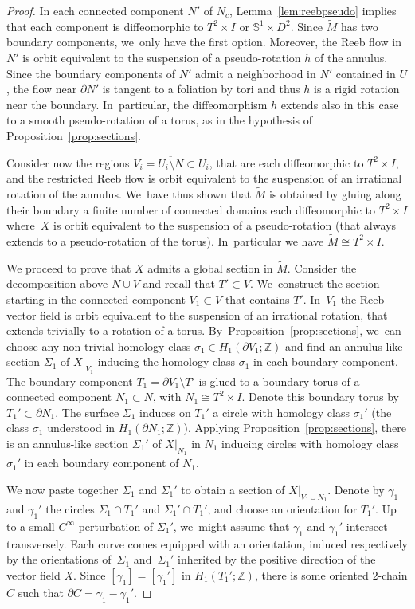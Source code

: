 \documentclass[11pt]{article}
\theoremstyle{definition}
\begin{document}
\begin{proof}
In each connected component $N'$ of $N_c$, Lemma~\ref{lem:reebpseudo} implies that each component is diffeomorphic to $T^2\times I$ or $\mathbb{S}^1\times D^2$. Since $\widetilde M$ has two boundary components, we~only have the first option. Moreover, the Reeb flow in $N'$ is orbit equivalent to the suspension of a pseudo-rotation $h$ of the annulus. Since the boundary components of $N'$ admit a neighborhood in $N'$ contained in $U$, the flow near $\partial N'$ is tangent to a foliation by tori and thus $h$ is a rigid rotation near the boundary. In~particular, the diffeomorphism $h$ extends also in this case to a smooth pseudo-rotation of a torus, as in the hypothesis of Proposition~\ref{prop:sections}.

Consider now the regions $V_i=\overline{U_i\setminus N}\subset U_i$, that are each diffeomorphic to $T^2\times I$, and the restricted Reeb flow is orbit equivalent to the suspension of an irrational rotation of the annulus. We~have thus shown that $\widetilde{M}$ is obtained by gluing along their boundary a finite number of connected domains each diffeomorphic to $T^2\times I$ where~$X$ is orbit equivalent to the suspension of a pseudo-rotation (that always extends to a pseudo-rotation of the torus). In~particular we have $\widetilde{M}\cong T^2\times I$.

{We proceed to prove that $X$ admits a global section in $\widetilde M$.} Consider the decomposition above $N\cup V$ and recall that $T'\subset V$. We~construct the section starting in the connected component $V_1\subset V$ that contains $T'$. In~$V_1$ the Reeb vector field is orbit equivalent to the suspension of an irrational rotation, that extends trivially to a rotation of a torus. By~Proposition~\ref{prop:sections}, we~can choose any non-trivial homology class $\sigma_1 \in H_1(\partial V_1; \mathbb{Z})$ and find an annulus-like section $\Sigma_1$ of $X|_{V_1}$ inducing the homology class $\sigma_1$ in each boundary component. The boundary component $T_1=\partial V_1\setminus T'$ is glued to a boundary torus of a connected component $N_1\subset N$, with $N_1\cong T^2\times I$. Denote this boundary torus by $T_1'\subset \partial N_1$. The surface $\Sigma_1$ induces on $T_1'$ a circle with homology class $\sigma_1'$ (the class $\sigma_1$ understood in $H_1(\partial N_1;\mathbb{Z})$). Applying Proposition~\ref{prop:sections}, there is an annulus-like section $\Sigma_1'$ of $X|_{N_1}$ in $N_1$ inducing circles with homology class~$\sigma_1'$ in each boundary component of $N_1$.

We now paste together $\Sigma_1$ and $\Sigma_1'$ to obtain a section of $X|_{V_1\cup N_1}$. Denote by $\gamma_1$ and $\gamma_1'$ the circles $\Sigma_1\cap T_1'$ and $\Sigma_1'\cap T_1'$, and choose an orientation for $T_1'$. Up to a small $C^\infty$ perturbation of $\Sigma_1'$, we~might assume that $\gamma_1$ and $\gamma_1'$ intersect transversely. Each curve comes equipped with an orientation, induced respectively by the orientations of~$\Sigma_1$ and~$\Sigma_1'$ inherited by the positive direction of the vector field $X$. Since $[\gamma_1]=[\gamma_1']$ in $H_1(T_1';\mathbb{Z})$, there is some oriented $2$-chain $C$ such that $\partial C=\gamma_1-\gamma_1'$.


\end{proof}
\end{document}
